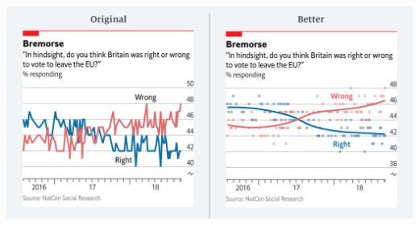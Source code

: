 \documentclass[letterpaper,12pt,twoside,]{pinp}
\begin{document}
\begin{center}\includegraphics[width=7in,height=4in]{../img/original-brexit} \end{center}

\end{document}
